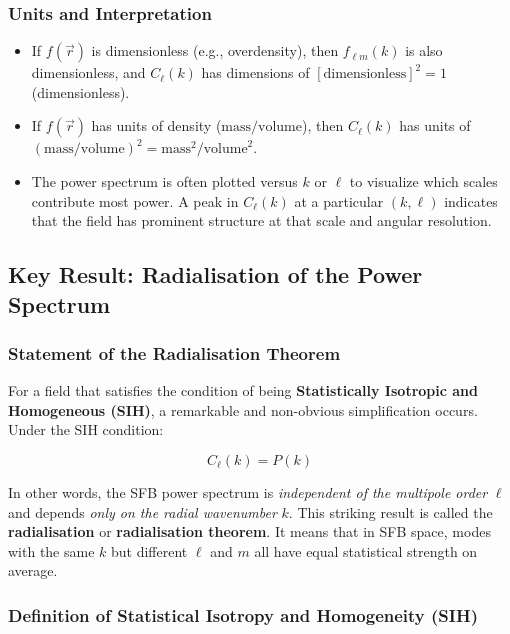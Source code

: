 \subsubsection{Units and Interpretation}

\begin{itemize}
    \item If $f(\vec{r})$ is dimensionless (e.g., overdensity), then $f_{\ell m}(k)$ is also dimensionless, and $C_\ell(k)$ has dimensions of $[\text{dimensionless}]^2 = 1$ (dimensionless).
    
    \item If $f(\vec{r})$ has units of density ($\text{mass}/\text{volume}$), then $C_\ell(k)$ has units of $(\text{mass}/\text{volume})^2 = \text{mass}^2/\text{volume}^2$.
    
    \item The power spectrum is often plotted versus $k$ or $\ell$ to visualize which scales contribute most power. A peak in $C_\ell(k)$ at a particular $(k, \ell)$ indicates that the field has prominent structure at that scale and angular resolution.
\end{itemize}

\subsection{Key Result: Radialisation of the Power Spectrum}
\label{sec:radialisation}

\subsubsection{Statement of the Radialisation Theorem}

For a field that satisfies the condition of being \textbf{Statistically Isotropic and Homogeneous (SIH)}, a remarkable and non-obvious simplification occurs. Under the SIH condition:

\begin{equation}
C_\ell(k) = P(k)
\label{eq:sfb_radialisation}
\end{equation}

In other words, the SFB power spectrum is \emph{independent of the multipole order} $\ell$ and depends \emph{only on the radial wavenumber} $k$. This striking result is called the \textbf{radialisation} or \textbf{radialisation theorem}. It means that in SFB space, modes with the same $k$ but different $\ell$ and $m$ all have equal statistical strength on average.

\subsubsection{Definition of Statistical Isotropy and Homogeneity (SIH)}

